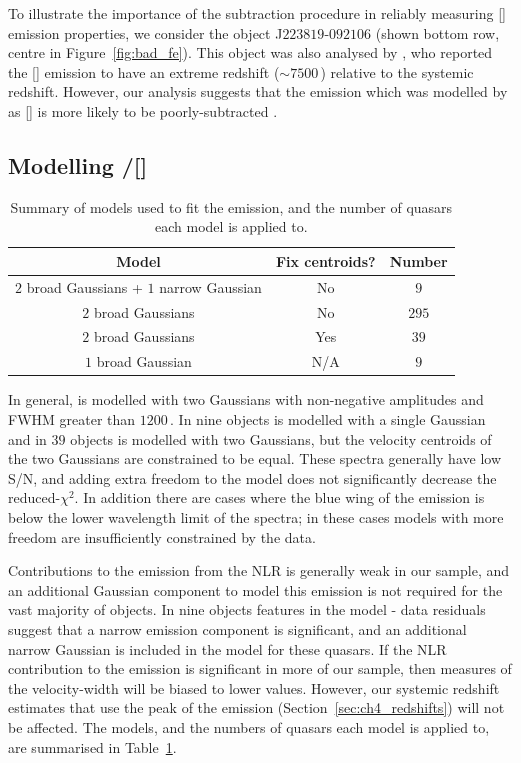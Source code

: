 To illustrate the importance of the  subtraction procedure in reliably measuring [] emission properties, we consider the object J$223819$-$092106$ (shown bottom row, centre in Figure~\ref{fig:bad_fe}). 
This object was also analysed by \citet{shen16a}, who reported the [] emission to have an extreme redshift ($\sim7500$\,\kms) relative to the \citet{hewett10} systemic redshift.
However, our analysis suggests that the emission which was modelled by \citet{shen16a} as [] is more likely to be poorly-subtracted .  

\subsection{Modelling \hbns/[]}
\label{sec:oiiimodel}

\begin{table}
  \centering
  \footnotesize 
  \caption{Summary of models used to fit the \hb emission, and the number of quasars each model is applied to.}
  \label{tab:hbmod}
    \begin{tabular}{ccc} 
    \hline
    Model & Fix centroids? & Number \\
    \hline
    $2$ broad Gaussians + $1$ narrow Gaussian & No & $9$ \\
    $2$ broad Gaussians & No  &  $295$ \\
    $2$ broad Gaussians & Yes &  $39$ \\
    $1$ broad Gaussian  & N/A &  $9$ \\
    \hline
    \end{tabular}
\end{table} 

In general, \hb is modelled with two Gaussians with non-negative amplitudes and FWHM greater than $1200$\,\kms.
In nine objects \hb is modelled with a single Gaussian and in $39$ objects \hb is modelled with two Gaussians, but the velocity centroids of the two Gaussians are constrained to be equal. 
These spectra generally have low S/N, and adding extra freedom to the model does not significantly decrease the  reduced-$\chi^2$.
In addition there are cases where the blue wing of the \hb emission is below the lower wavelength limit of the spectra; in these cases models with more freedom are insufficiently constrained by the data.    

Contributions to the \hb emission from the NLR is generally weak in our sample, and an additional Gaussian component to model this emission is not required for the vast majority of objects. 
In nine objects features in the model - data residuals suggest that a narrow emission component is significant, and an additional narrow Gaussian is included in the model for these quasars. 
If the NLR contribution to the \hb emission is significant in more of our sample, then measures of the \hb velocity-width will be biased to lower values. 
However, our systemic redshift estimates that use the peak of the \hb emission (Section~\ref{sec:ch4_redshifts}) will not be affected. 
The \hb models, and the numbers of quasars each model is applied to, are summarised in Table~\ref{tab:hbmod}. 

